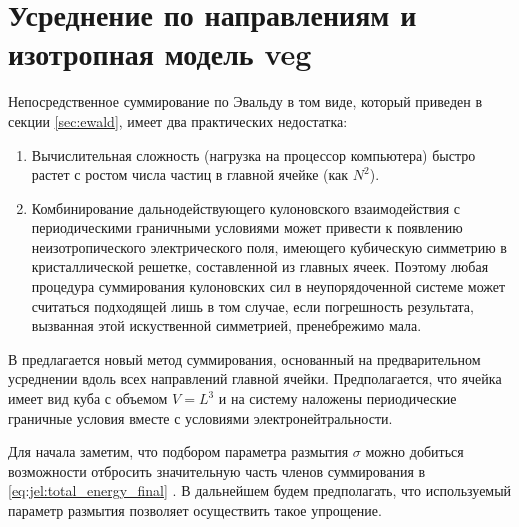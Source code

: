 \section{Усреднение по направлениям и изотропная модель \texorpdfstring{\acrshort{veg}}{ВЭГ}}
Непосредственное суммирование по Эвальду в том виде, который приведен в секции \ref{sec:ewald}, имеет два практических недостатка:
\begin{enumerate}
    \item Вычислительная сложность (нагрузка на процессор компьютера) быстро растет с ростом числа частиц в главной ячейке (как $N^2$).
    \item Комбинирование дальнодействующего кулоновского взаимодействия с периодическими граничными условиями может привести к появлению неизотропического электрического поля, имеющего кубическую симметрию в кристаллической решетке, составленной из главных ячеек.
        Поэтому любая процедура суммирования кулоновских сил в неупорядоченной системе может считаться подходящей лишь в том случае, если погрешность результата, вызванная этой искуственной симметрией, пренебрежимо мала.
\end{enumerate}
В \cite{jel:pre-averaged_summation} предлагается новый метод суммирования, основанный на предварительном усреднении вдоль всех направлений главной ячейки.
Предполагается, что ячейка имеет вид куба с объемом $V = L^3$ и на систему наложены периодические граничные условия вместе с условиями электронейтральности.

Для начала заметим, что подбором параметра размытия $\sigma$ можно добиться возможности отбросить значительную часть членов суммирования в \eqref{eq:jel:total_energy_final} \cite{rapaport:terms_cutoff}. 
В дальнейшем будем предполагать, что используемый параметр размытия позволяет  осуществить такое упрощение.

